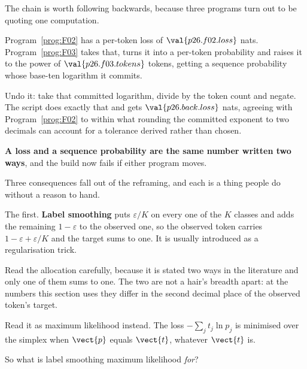 \begin{fr}
The chain is worth following backwards, because three programs turn out to be
quoting one computation.

Program~\ref{prog:F02} has a per-token loss of $\val{p26.f02.loss}$ nats.
Program~\ref{prog:F03} takes that, turns it into a per-token probability and
raises it to the power of $\val{p26.f03.tokens}$ tokens, getting a sequence
probability whose base-ten logarithm it commits.

Undo it: take that committed logarithm, divide by the token count and negate.
The script does exactly that and gets $\val{p26.back.loss}$ nats, agreeing
with Program~\ref{prog:F02} to within what rounding the committed exponent to
two decimals can account for \dash{} a tolerance derived rather than chosen.

\textbf{A loss and a sequence probability are the same number written two
ways}, and the build now fails if either program moves.
\end{fr}

\begin{fr}

Three consequences fall out of the reframing, and each is a thing people do
without a reason to hand.
\end{fr}

\begin{fr}
The first. \textbf{Label smoothing} puts $\varepsilon/K$ on every one of the
$K$ classes and adds the remaining $1-\varepsilon$ to the observed one, so the
observed token carries $1 - \varepsilon + \varepsilon/K$ and the target sums to
one. It is usually introduced as a regularisation trick.

Read the allocation carefully, because it is stated two ways in the literature
and only one of them sums to one. The two are not a hair's breadth apart: at
the numbers this section uses they differ in the second decimal place of the
observed token's target.

Read it as maximum likelihood instead. The loss $-\sum_j t_j \ln p_j$ is
minimised over the simplex when $\vect{p}$ equals $\vect{t}$, whatever
$\vect{t}$ is.

So what is label smoothing maximum likelihood \emph{for}?
\dotline
\nextframe
\end{fr}

